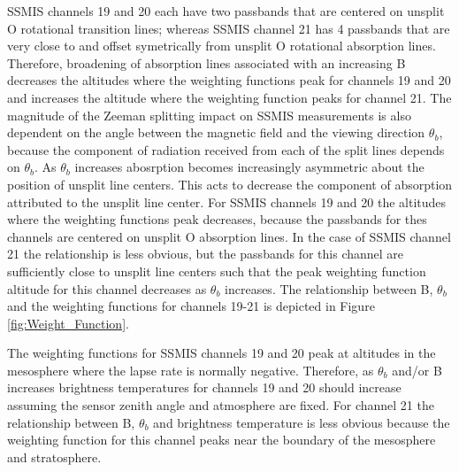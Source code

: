 SSMIS channels 19 and 20 each have two passbands that are centered on unsplit O rotational
transition lines; whereas SSMIS channel 21 has 4 passbands that are very close to and offset symetrically from unsplit O rotational absorption
lines. Therefore, broadening of absorption lines associated with an increasing B decreases the altitudes where the weighting functions peak for channels 19 and 20 and increases
the altitude where the weighting function peaks for channel 21. 
The magnitude of the Zeeman splitting impact on SSMIS measurements is also dependent on 
the angle between the magnetic field and the viewing direction $\theta_{b}$, because the component of radiation received from each of the split lines depends on 
$\theta_{b}$. As $\theta_{b}$ increases abosrption becomes increasingly asymmetric about the position of unsplit line centers. This 
acts to decrease the component of absorption attributed to the unsplit line center. For SSMIS channels 19 and 20 the altitudes where the 
weighting functions peak decreases, because the passbands for thes channels are centered on unsplit O absorption lines. In the 
case of SSMIS channel 21 the relationship is less obvious, but the passbands for this channel are sufficiently close to
unsplit line centers such that the peak weighting function altitude for this channel decreases as $\theta_{b}$ increases.
The relationship between B, $\theta_{b}$ and the weighting functions for channels 19-21 is depicted in Figure \ref{fig:Weight_Function}.

\smallskip
\smallskip

The weighting functions for SSMIS channels 19 and 20 peak at altitudes in the mesosphere where the lapse rate is normally negative. 
Therefore, as $\theta_{b}$ and/or B increases brightness temperatures for channels 19 and 20 should increase assuming the
sensor zenith angle and atmosphere are fixed. For channel 21 the relationship between B, $\theta_{b}$ and brightness temperature is less obvious 
because the weighting function for this channel peaks near the boundary of the mesosphere and stratosphere.
 
\newpage
  
